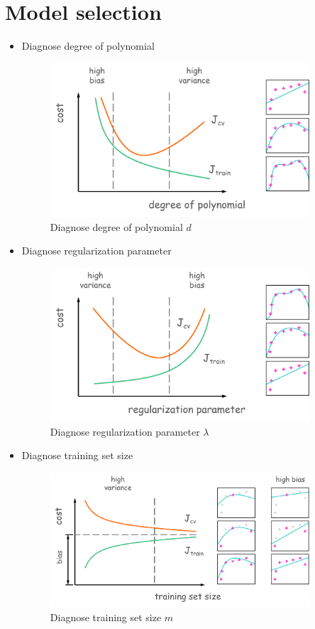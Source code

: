 \section{Model selection}
\begin{itemize}
    \item Diagnose degree of polynomial
    \begin{figure}[H]
        \centering
        \includegraphics[width=3.8in]{./images/diagnose_degree_of_polynomial.png}
        \caption{Diagnose degree of polynomial $d$}
    \end{figure}

    \item Diagnose regularization parameter
    \begin{figure}[H]
        \centering
        \includegraphics[width=3.8in]{./images/diagnose_regularization_parameter.png}
        \caption{Diagnose regularization parameter $\lambda$}
    \end{figure}

    \item Diagnose training set size
    \begin{figure}[H]
        \centering
        \includegraphics[width=3.8in]{./images/diagnose_training_set_size.png}
        \caption{Diagnose training set size $m$}
    \end{figure}

\end{itemize}


